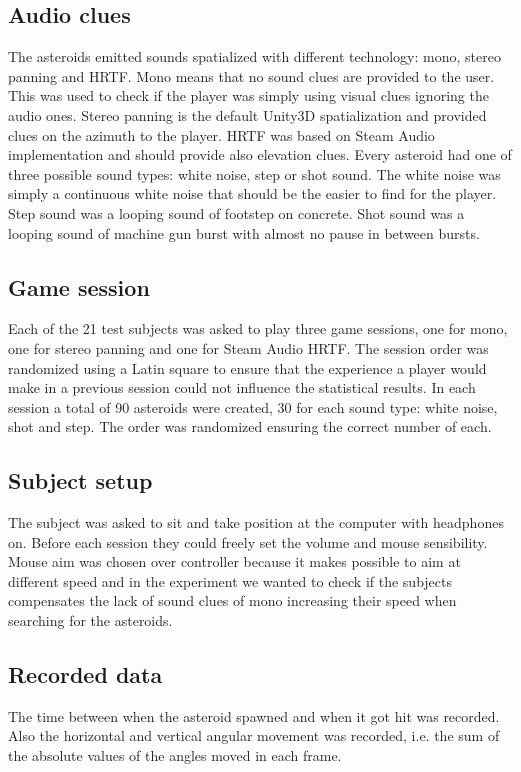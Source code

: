 \documentclass[conference]{IEEEtran}
\begin{document}
\subsection{Audio clues}
The asteroids emitted sounds spatialized with different technology: mono, stereo panning and HRTF. Mono means that no sound clues are provided to the user. This was used to check if the player was simply using visual clues ignoring the audio ones. Stereo panning is the default Unity3D spatialization and provided clues on the azimuth to the player. HRTF was based on Steam Audio implementation and should provide also elevation clues.
Every asteroid had one of three possible sound types: white noise, step or shot sound. The white noise was simply a continuous white noise that should be the easier to find for the player. Step sound was a looping sound of footstep on concrete. Shot sound was a looping sound of machine gun burst with almost no pause in between bursts.

\subsection{Game session}
Each of the 21 test subjects was asked to play three game sessions, one for mono, one for stereo panning and one for Steam Audio HRTF. The session order was randomized using a Latin square to ensure that the experience a player would make in a previous session could not influence the statistical results.
In each session a total of 90 asteroids were created, 30 for each sound type: white noise, shot and step. The order was randomized ensuring the correct number of each.

\subsection{Subject setup}
The subject was asked to sit and take position at the computer with headphones on. Before each session they could freely set the volume and mouse sensibility. Mouse aim was chosen over controller because it makes possible to aim at different speed and in the experiment we wanted to check if the subjects compensates the lack of sound clues of mono increasing their speed when searching for the asteroids.

\subsection{Recorded data}
The time between when the asteroid spawned and when it got hit was recorded. Also the horizontal and vertical angular movement was recorded, i.e. the sum of the absolute values of the angles moved in each frame.
\end{document}
